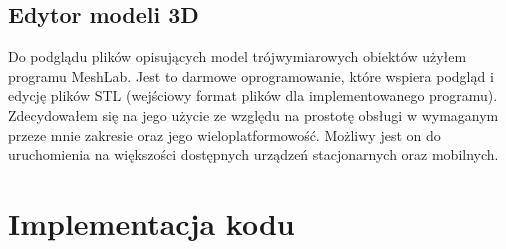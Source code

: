 \documentclass[a4paper,12pt,twoside,openany]{report}
\begin{document}
    \subsection{Edytor modeli 3D}
      Do podglądu plików opisujących model trójwymiarowych obiektów użyłem programu MeshLab. Jest to darmowe 
      oprogramowanie, które wspiera podgląd i edycję plików STL (wejściowy format plików dla implementowanego programu). 
      Zdecydowałem się na jego użycie ze względu na prostotę obsługi w wymaganym przeze mnie zakresie oraz jego wieloplatformowość.
      Możliwy jest on do uruchomienia na większości dostępnych urządzeń stacjonarnych oraz mobilnych.

  \section{Implementacja kodu}
\end{document}
